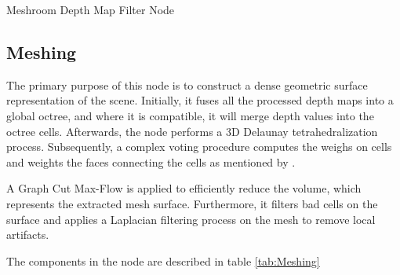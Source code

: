 \documentclass[12pt]{report}
\begin{document}
  \begin{table}[H]
    \centering
    \caption{Meshroom Depth Map Filter Node}
    \label{tab:DepthMapFilter}
    \end{table}  
  


  \subsection{Meshing}
  The primary purpose of this node is to construct a dense geometric surface representation of the scene.
  Initially, it fuses all the processed depth maps into a global octree, and where it is compatible, it will merge depth values into the octree cells.
  Afterwards, the node performs a 3D Delaunay tetrahedralization process. Subsequently, a complex voting procedure computes the weighs on cells and weights the faces connecting 
  the cells as mentioned by  .
  
  A Graph Cut Max-Flow  is applied to efficiently reduce the volume, which represents the extracted mesh surface. 
  Furthermore, it filters bad cells on the surface and applies a Laplacian filtering process on the mesh to remove local artifacts.
  
  The components in the node are described in table \ref{tab:Meshing}
  
\end{document}
